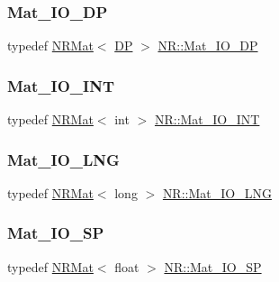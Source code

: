 \mbox{\label{namespaceNR_ad1513aa4697878ed3bff0b8b3c9dd910}} 
\subsubsection{\texorpdfstring{Mat\_IO\_DP}{Mat\_IO\_DP}}
{\footnotesize\ttfamily typedef \mbox{\hyperlink{classNR_1_1NRMat}{N\+R\+Mat}}$<$ \mbox{\hyperlink{namespaceNR_af6ff762dd605ff477b8e52387253a02a}{DP}} $>$ \mbox{\hyperlink{namespaceNR_ad1513aa4697878ed3bff0b8b3c9dd910}{N\+R\+::\+Mat\+\_\+\+I\+O\+\_\+\+DP}}}

\mbox{\label{namespaceNR_a84800a4c22e55fbe1e67161483bac3a9}} 
\subsubsection{\texorpdfstring{Mat\_IO\_INT}{Mat\_IO\_INT}}
{\footnotesize\ttfamily typedef \mbox{\hyperlink{classNR_1_1NRMat}{N\+R\+Mat}}$<$ int $>$ \mbox{\hyperlink{namespaceNR_a84800a4c22e55fbe1e67161483bac3a9}{N\+R\+::\+Mat\+\_\+\+I\+O\+\_\+\+I\+NT}}}

\mbox{\label{namespaceNR_abb2210688d9255481fd052afcacb022a}} 
\subsubsection{\texorpdfstring{Mat\_IO\_LNG}{Mat\_IO\_LNG}}
{\footnotesize\ttfamily typedef \mbox{\hyperlink{classNR_1_1NRMat}{N\+R\+Mat}}$<$ long $>$ \mbox{\hyperlink{namespaceNR_abb2210688d9255481fd052afcacb022a}{N\+R\+::\+Mat\+\_\+\+I\+O\+\_\+\+L\+NG}}}

\mbox{\label{namespaceNR_a1003f2aa49b4cba93bf437a81133c9f4}} 
\subsubsection{\texorpdfstring{Mat\_IO\_SP}{Mat\_IO\_SP}}
{\footnotesize\ttfamily typedef \mbox{\hyperlink{classNR_1_1NRMat}{N\+R\+Mat}}$<$ float $>$ \mbox{\hyperlink{namespaceNR_a1003f2aa49b4cba93bf437a81133c9f4}{N\+R\+::\+Mat\+\_\+\+I\+O\+\_\+\+SP}}}

